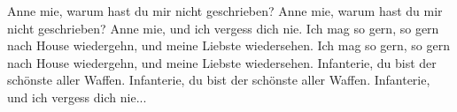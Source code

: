 \beginverse*
Anne mie, warum hast du mir nicht geschrieben?
Anne mie, warum hast du mir nicht geschrieben?
Anne mie, und ich vergess dich nie.
Ich mag so gern, so gern nach House wiedergehn, und meine Liebste wiedersehen.
Ich mag so gern, so gern nach House wiedergehn, und meine Liebste wiedersehen.
\endverse
\beginverse*
Infanterie, du bist der schönste aller Waffen.
Infanterie, du bist der schönste aller Waffen.
Infanterie, und ich vergess dich nie...
\endverse
\endsong